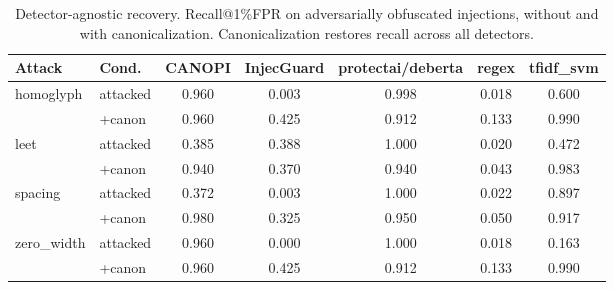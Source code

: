 \begin{table}[ht]\centering
\caption{Detector-agnostic recovery. Recall@1\%FPR on adversarially obfuscated injections, without and with canonicalization. Canonicalization restores recall across all detectors.}
\label{tab:recovery}
\small
\begin{tabular}{llccccc}
\toprule
Attack & Cond. & CANOPI & InjecGuard & protectai/deberta & regex & tfidf_svm \\
\midrule
homoglyph & attacked & 0.960 & 0.003 & 0.998 & 0.018 & 0.600 \\
 & +canon & 0.960 & 0.425 & 0.912 & 0.133 & 0.990 \\
\midrule
leet & attacked & 0.385 & 0.388 & 1.000 & 0.020 & 0.472 \\
 & +canon & 0.940 & 0.370 & 0.940 & 0.043 & 0.983 \\
\midrule
spacing & attacked & 0.372 & 0.003 & 1.000 & 0.022 & 0.897 \\
 & +canon & 0.980 & 0.325 & 0.950 & 0.050 & 0.917 \\
\midrule
zero_width & attacked & 0.960 & 0.000 & 1.000 & 0.018 & 0.163 \\
 & +canon & 0.960 & 0.425 & 0.912 & 0.133 & 0.990 \\
\midrule
\bottomrule
\end{tabular}
\end{table}